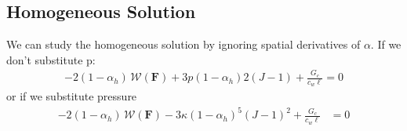 \documentclass[12pt,3p]{article}
\numberwithin{equation}{section}
\begin{document}
\subsection{Homogeneous Solution}
We can study the homogeneous solution by ignoring spatial derivatives of $\alpha$. If we don't substitute p:
\begin{align*}
- 2 (1 - \alpha_h) \, \mathcal{W} (\mathbf{F}) + 3 p (1- \alpha_h)2 (J-1) + \frac{G_{c}}{c_{w} \ell } = 0 
\end{align*}
or if we substitute pressure
\begin{align*}
- 2 (1 - \alpha_{h}) \, \mathcal{W} (\mathbf{F}) - 3 \kappa (1-\alpha_{h})^5 (J-1)^2 + \frac{G_{c}}{c_{w} \ell} &= 0 
\end{align*}
\end{document}
